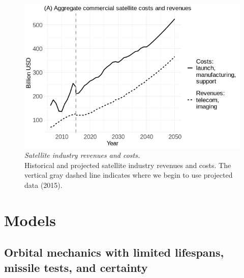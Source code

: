 \documentclass[12pt]{article}
\begin{document}
\begin{figure}[H]
	\centering
	\includegraphics[width=\textwidth]{../../images/industry_revcost_plot.png}
	\captionsetup{format=hang}
	\caption[Historical and projected satellite industry revenues and costs]{\textit{Satellite industry revenues and costs.} \\
		Historical and projected satellite industry revenues and costs. The vertical gray dashed line indicates where we begin to use projected data (2015).
	}
	\label{revcost_plot}
\end{figure}

\section{Models}

\subsection{Orbital mechanics with limited lifespans, missile tests, and certainty}
\end{document}
